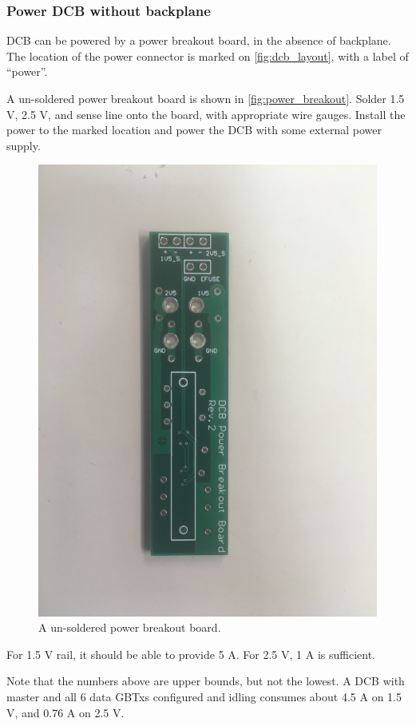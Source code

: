 \subsubsection{Power DCB without backplane}
DCB can be powered by a power breakout board, in the absence of backplane.
The location of the power connector is marked on \autoref{fig:dcb_layout}, with
a label of ``power''.

A un-soldered power breakout board is shown in \autoref{fig:power_breakout}.
Solder 1.5 V, 2.5 V, and sense line onto the board, with appropriate wire
gauges.
Install the power to the marked location and power the DCB with some external
power supply.

\begin{figure}[!ht]
\centering
\includegraphics[width=0.9\linewidth]{res/power_breakout_board.jpg}
\caption{A un-soldered power breakout board.}
\label{fig:power_breakout}
\end{figure}

\begin{leftbar}
    For 1.5 V rail, it should be able to provide 5 A.
    For 2.5 V, 1 A is sufficient.

    Note that the numbers above are upper bounds, but not the lowest.
    A DCB with master and all 6 data GBTxs configured and idling consumes about
    4.5 A on 1.5 V, and 0.76 A on 2.5 V.
\end{leftbar}
